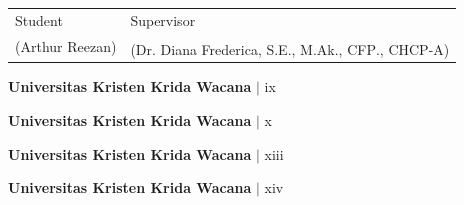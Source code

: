 \documentclass[12pt,a4paper]{article}
\newcommand{\ukrida}{Universitas Kristen Krida Wacana}
\newcommand{\nahamahasiswa}{Arthur Reezan}
\newcommand{\dosbim}{Dr. Diana Frederica, S.E., M.Ak., CFP\textsuperscript{\textregistered}., CHCP-A}
\numberwithin{equation}{section}
\begin{document}
\vspace{0.8cm}
\begin{tabular}{p{6cm} p{6cm}}
  Student & Supervisor \\[2.2cm]
  (\nahamahasiswa) & (\dosbim) \\
\end{tabular}

\vfill
\begin{flushright}
  \footnotesize\textbf{\ukrida} $|$ ix
\end{flushright}

\newpage
\thispagestyle{frontmatter}
\renewcommand{\contentsname}{DAFTAR ISI}
\tableofcontents
{}

\vfill
\begin{flushright}
  \footnotesize\textbf{\ukrida} $|$ x
\end{flushright}

\newpage
\thispagestyle{frontmatter}
\renewcommand{\listtablename}{DAFTAR TABEL}
\listoftables
{}

\vfill
\begin{flushright}
  \footnotesize\textbf{\ukrida} $|$ xiii
\end{flushright}

\newpage
\thispagestyle{frontmatter}
\renewcommand{\listfigurename}{DAFTAR GAMBAR}
\listoffigures
{}

\vfill
\begin{flushright}
  \footnotesize\textbf{\ukrida} $|$ xiv
\end{flushright}

\newpage
{}
\pagestyle{fancy}

\setcounter{section}{0}
\end{document}
